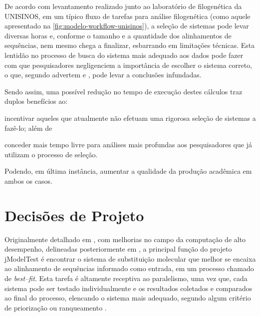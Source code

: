 \documentclass[english,brazilian]{UNISINOSmonografia} %
\begin{document}

De acordo com levantamento realizado junto ao laboratório de filogenética da UNISINOS, em um típico fluxo de tarefas para análise filogenética (como aquele apresentado na \autoref{fig:modelo-workflow-unisinos}), a seleção de sistemas pode levar diversas horas e, conforme o tamanho e a quantidade dos alinhamentos de sequências, nem mesmo chega a finalizar, esbarrando em limitações técnicas.
Esta lentidão no processo de busca do sistema mais adequado aos dados pode fazer com que pesquisadores negligenciem a importância de escolher o sistema correto, o que, segundo advertem  e , pode levar a conclusões infundadas.


Sendo assim, uma possível redução no tempo de execução destes cálculos traz duplos benefícios ao: 
\begin{inparaenum} 
	\item incentivar aqueles que atualmente não efetuam uma rigorosa seleção de sistemas a fazê-lo; além de 
	\item conceder mais tempo livre para análises mais profundas aos pesquisadores que já utilizam o processo de seleção.
\end{inparaenum}
Podendo, em última instância, aumentar a qualidade da produção acadêmica em ambos os casos.


\section{Decisões de Projeto}
\label{sec:modelo-decisoes}




Originalmente detalhado em , com melhorias no campo da computação de alto desempenho, delineadas posteriormente em , a principal função do projeto jModelTest é encontrar o sistema de substituição molecular que melhor se encaixa ao alinhamento de sequências informado como entrada, em um processo chamado de \textit{best--fit}.
Esta tarefa é altamente receptiva ao paralelismo, uma vez que, cada sistema pode ser testado individualmente e os resultados coletados e comparados ao final do processo, elencando o sistema mais adequado, segundo algum critério de priorização ou ranqueamento \cite{Keane2006a}.
\end{document}
